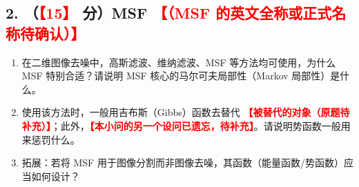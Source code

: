 \documentclass[12pt,a4paper,UTF8,fontset=fandol]{ctexart}
\newcommand{\ph}[1]{\textcolor{red}{\textbf{【#1】}}}
\begin{document}
\subsection*{2. （\ph{15} 分）MSF \ph{（MSF 的英文全称或正式名称待确认）}}

\begin{enumerate}[label=（\arabic*）]
  \item 在二维图像去噪中，高斯滤波、维纳滤波、MSF 等方法均可使用，为什么 MSF 特别合适？请说明 MSF 核心的马尔可夫局部性（Markov 局部性）是什么。
  \item 使用该方法时，一般用吉布斯（Gibbs）函数去替代 \ph{被替代的对象（原题待补充）}；此外，\ph{本小问的另一个设问已遗忘，待补充}。请说明势函数一般用来惩罚什么。
  \item 拓展：若将 MSF 用于图像分割而非图像去噪，其函数（能量函数/势函数）应当如何设计？
\end{enumerate}
\end{document}
